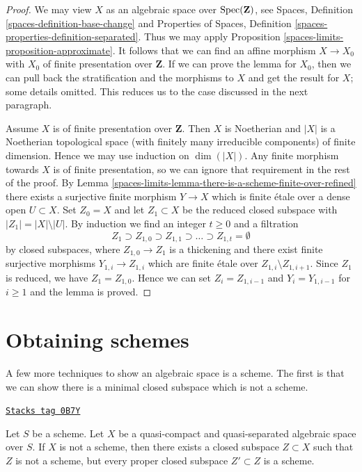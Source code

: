 \begin{proof}
We may view $X$ as an algebraic space over $\operatorname{Spec}(\mathbf{Z})$, see
Spaces, Definition \ref{spaces-definition-base-change} and
Properties of Spaces, Definition \ref{spaces-properties-definition-separated}.
Thus we may apply Proposition \ref{spaces-limits-proposition-approximate}.
It follows that we can find an affine morphism $X \to X_0$
with $X_0$ of finite presentation over $\mathbf{Z}$.
If we can prove the lemma for $X_0$, then we can pull back
the stratification and the morphisms to $X$ and get the result for $X$;
some details omitted. This reduces us to the case discussed in the
next paragraph.

\medskip\noindent
Assume $X$ is of finite presentation over $\mathbf{Z}$.
Then $X$ is Noetherian and $|X|$ is a Noetherian topological
space (with finitely many irreducible components) of finite dimension.
Hence we may use induction on $\dim(|X|)$.
Any finite morphism towards $X$ is of finite presentation, so
we can ignore that requirement in the rest of the proof.
By Lemma \ref{spaces-limits-lemma-there-is-a-scheme-finite-over-refined}
there exists a surjective finite morphism $Y \to X$ which is
finite \'etale over a dense open $U \subset X$.
Set $Z_0 = X$ and let $Z_1 \subset X$ be the reduced closed subspace
with $|Z_1| = |X| \setminus |U|$.
By induction we find an integer $t \geq 0$ and a filtration
$$
Z_1 \supset Z_{1, 0} \supset Z_{1, 1} \supset \ldots
\supset Z_{1, t} = \emptyset
$$
by closed subspaces, where $Z_{1, 0} \to Z_1$ is a thickening
and there exist finite surjective morphisms $Y_{1, i} \to Z_{1, i}$
which are finite \'etale over $Z_{1, i} \setminus Z_{1, i + 1}$.
Since $Z_1$ is reduced, we have $Z_1 = Z_{1, 0}$.
Hence we can set $Z_i = Z_{1, i - 1}$ and $Y_i = Y_{1, i - 1}$
for $i \geq 1$ and the lemma is proved.
\end{proof}

\section{Obtaining schemes}
\label{spaces-limits-section-representable}
A few more techniques to show an algebraic space is a scheme.
The first is that we can show there is a minimal closed subspace
which is not a scheme.

\begin{lemma}
\label{spaces-limits-lemma-minimal-closed-subspace}
\href{https://stacks.math.columbia.edu/tag/0B7Y}{\texttt{Stacks tag 0B7Y}}

Let $S$ be a scheme. Let $X$ be a quasi-compact and quasi-separated
algebraic space over $S$. If $X$ is not a scheme, then there exists
a closed subspace $Z \subset X$ such that $Z$ is not a scheme, but
every proper closed subspace $Z' \subset Z$ is a scheme.
\end{lemma}

